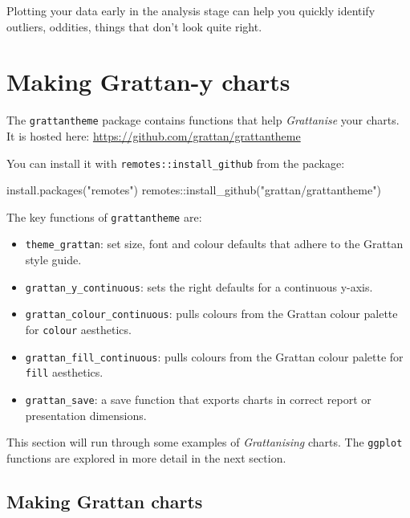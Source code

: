 \documentclass[
]{book}
\newenvironment{Shaded}{\begin{snugshade}}{\end{snugshade}}
\newcommand{\FunctionTok}[1]{\textcolor[rgb]{0.00,0.00,0.00}{#1}}
\newcommand{\NormalTok}[1]{#1}
\newcommand{\SpecialCharTok}[1]{\textcolor[rgb]{0.00,0.00,0.00}{#1}}
\newcommand{\StringTok}[1]{\textcolor[rgb]{0.31,0.60,0.02}{#1}}
\providecommand{\tightlist}{%
  \setlength{\itemsep}{0pt}\setlength{\parskip}{0pt}}
\begin{document}
Plotting your data early in the analysis stage can help you quickly identify outliers, oddities, things that don't look quite right.

\hypertarget{making-grattan-y-charts}{%
\section{Making Grattan-y charts}\label{making-grattan-y-charts}}

The \texttt{grattantheme} package contains functions that help \emph{Grattanise} your charts. It is hosted here: \url{https://github.com/grattan/grattantheme}

You can install it with \texttt{remotes::install\_github} from the package:

\begin{Shaded}
\begin{Highlighting}[]
\FunctionTok{install.packages}\NormalTok{(}\StringTok{"remotes"}\NormalTok{)}
\NormalTok{remotes}\SpecialCharTok{::}\FunctionTok{install\_github}\NormalTok{(}\StringTok{"grattan/grattantheme"}\NormalTok{)}
\end{Highlighting}
\end{Shaded}

The key functions of \texttt{grattantheme} are:

\begin{itemize}
\tightlist
\item
  \texttt{theme\_grattan}: set size, font and colour defaults that adhere to the Grattan style guide.
\item
  \texttt{grattan\_y\_continuous}: sets the right defaults for a continuous y-axis.
\item
  \texttt{grattan\_colour\_continuous}: pulls colours from the Grattan colour palette for \texttt{colour} aesthetics.
\item
  \texttt{grattan\_fill\_continuous}: pulls colours from the Grattan colour palette for \texttt{fill} aesthetics.
\item
  \texttt{grattan\_save}: a save function that exports charts in correct report or presentation dimensions.
\end{itemize}

This section will run through some examples of \emph{Grattanising} charts. The \texttt{ggplot} functions are explored in more detail in the next section.

\hypertarget{making-grattan-charts}{%
\subsection{Making Grattan charts}\label{making-grattan-charts}}
\end{document}
